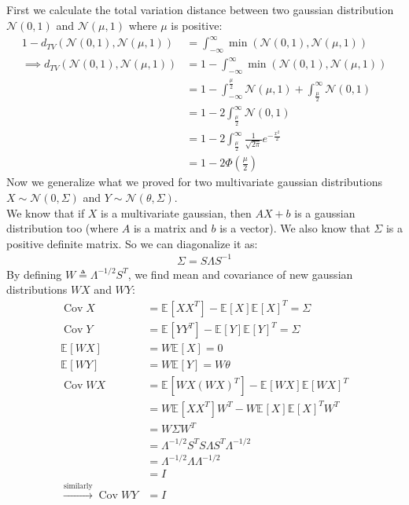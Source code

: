 \documentclass{article}
\numberwithin{equation}{section}
\newcommand{\EX}[2][]{\mathbb{E}_{#1}\left[#2\right]}%
\newcommand{\transpose}{^T}
\DeclareMathOperator*{\Cov}{Cov}
\begin{document}
\subsection{}
First we calculate the total variation distance between two gaussian distribution \(\mathcal{N}(0, 1)\) and \(\mathcal{N}(\mu, 1)\) where \(\mu\) is positive:
\begin{align}
1 - d_{TV}(\mathcal{N}(0, 1), \mathcal{N}(\mu, 1)) &= \int_{-\infty}^{\infty} \min(\mathcal{N}(0, 1), \mathcal{N}(\mu, 1))\\
\implies d_{TV}(\mathcal{N}(0, 1), \mathcal{N}(\mu, 1)) &= 1 - \int_{-\infty}^{\infty} \min(\mathcal{N}(0, 1), \mathcal{N}(\mu, 1))\\
&= 1 - \int_{-\infty}^{\frac{\mu}{2}} \mathcal{N}(\mu, 1) + \int_{\frac{\mu}{2}}^{\infty} \mathcal{N}(0, 1)\\
&= 1 - 2 \int_{\frac{\mu}{2}}^{\infty} \mathcal{N}(0, 1)\\
&= 1 - 2 \int_{\frac{\mu}{2}}^{\infty} \frac{1}{\sqrt{2\pi}} e^{-\frac{x^2}{2}}\\
&= 1 - 2 \Phi(\frac{\mu}{2})
\end{align}
Now we generalize what we proved for two multivariate gaussian distributions \(X\sim \mathcal{N}(0, \Sigma)\) and \(Y\sim \mathcal{N}(\theta, \Sigma)\).\\
We know that if \(X\) is a multivariate gaussian, then \(AX + b\) is a gaussian distribution too (where \(A\) is a matrix and \(b\) is a vector).
We also know that \(\Sigma\) is a positive definite matrix.
So we can diagonalize it as:
\begin{align}
\Sigma = S \Lambda S^{-1}
\end{align}
By defining \(W\triangleq \Lambda^{-1/2} S\transpose\), we find mean and covariance of new gaussian distributions \(WX\) and \(WY\):
\begin{align}
\Cov{X} &= \EX{XX\transpose} - \EX{X}\EX{X}\transpose = \Sigma\\
\Cov{Y} &= \EX{YY\transpose} - \EX{Y}\EX{Y}\transpose = \Sigma\\
\EX{WX} &= W\EX{X} = 0\\
\EX{WY} &= W\EX{Y} = W\theta\\
\Cov{WX} &= \EX{WX (WX)\transpose} - \EX{WX}\EX{WX}\transpose\\
&= W\EX{XX\transpose}W\transpose - W\EX{X}\EX{X}\transpose W\transpose\\
&= W\Sigma W\transpose\\
&= \Lambda^{-1/2} S\transpose S \Lambda S\transpose \Lambda^{-1/2}\\
&= \Lambda^{-1/2} \Lambda \Lambda^{-1/2}\\
&= I\\
\xrightarrow{\text{similarly}} \Cov{WY} &= I
\end{align}
\end{document}

